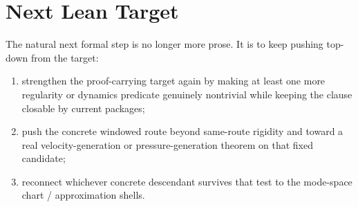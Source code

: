 \documentclass[11pt]{article}
\begin{document}
\section{Next Lean Target}

The natural next formal step is no longer more prose.  It is to keep pushing
top-down from the target:
\begin{enumerate}[leftmargin=1.5em]
  \item strengthen the proof-carrying target again by making at least one more
  regularity or dynamics predicate genuinely nontrivial while keeping the clause
  closable by current packages;
  \item push the concrete windowed route beyond same-route rigidity and toward a
  real velocity-generation or pressure-generation theorem on that fixed
  candidate;
  \item reconnect whichever concrete descendant survives that test to the
  mode-space chart / approximation shells.
\end{enumerate}
\end{document}
